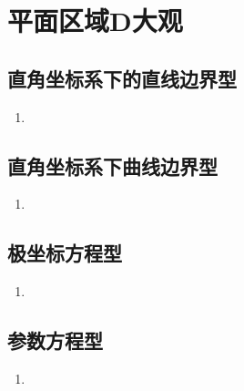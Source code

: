 \documentclass[a4paper,12pt]{article}
\begin{document}



    \section{平面区域D大观}

    \subsection{直角坐标系下的直线边界型}

    \begin{enumerate}
        \item
    \end{enumerate}

    \subsection{直角坐标系下曲线边界型}

    \begin{enumerate}
        \item
    \end{enumerate}

    \subsection{极坐标方程型}

    \begin{enumerate}
        \item
    \end{enumerate}

    \subsection{参数方程型}

    \begin{enumerate}
        \item
    \end{enumerate}
\end{document}

